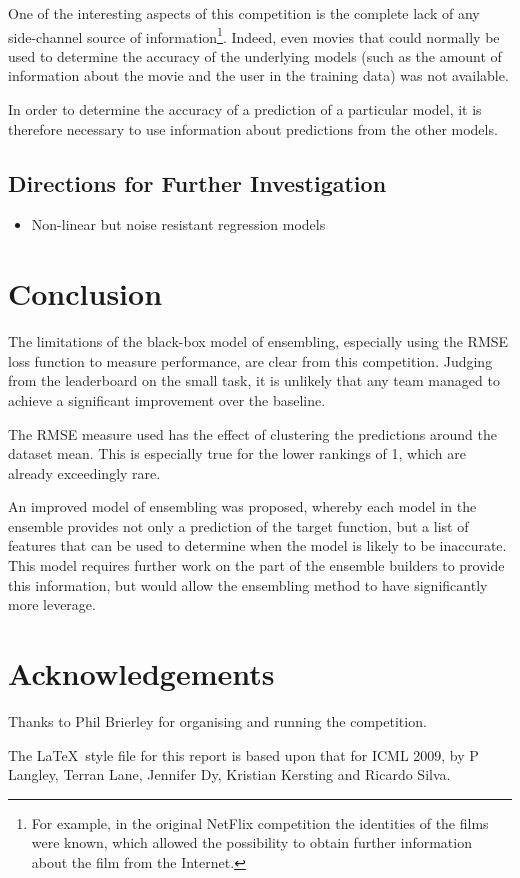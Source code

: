 \documentclass{article}
\begin{document}
One of the interesting aspects of this competition is the complete lack of any
side-channel source of information\footnote{For example, in the original NetFlix
competition the identities of the films were known, which allowed the
possibility to obtain further information about the film from the Internet.}.  Indeed, even movies that could normally be used to determine the accuracy of the underlying models (such as the amount of information about the movie and the user in the training data) was not available.

In order to determine the accuracy of a prediction of a particular model, it is
therefore necessary to use information about predictions from the other models.


\subsection{}


\subsection{Directions for Further Investigation}

\begin{itemize}
\item Non-linear but noise resistant regression models
\end{itemize}


\section{Conclusion}

The limitations of the black-box model of ensembling, especially using the RMSE loss function to measure performance, are clear from this competition.  Judging from the leaderboard on the small task, it is unlikely that any team managed to achieve a significant improvement over the baseline.

The RMSE measure used has the effect of clustering the predictions around the dataset mean.  This is especially true for the lower rankings of 1, which are already exceedingly rare.

An improved model of ensembling was proposed, whereby each model in the ensemble provides not only a prediction of the target function, but a list of features that can be used to determine when the model is likely to be inaccurate.  This model requires further work on the part of the ensemble builders to provide this information, but would allow the ensembling method to have significantly more leverage.

\section*{Acknowledgements} 

Thanks to Phil Brierley for organising and running the competition.

The \LaTeX\ style file for this report is based upon that for ICML 2009, by P Langley, Terran Lane, Jennifer Dy, Kristian Kersting and Ricardo Silva.




\end{document}
